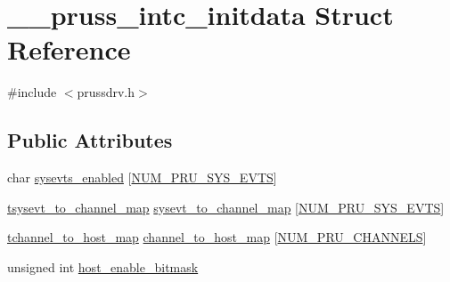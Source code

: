\hypertarget{struct____pruss__intc__initdata}{\section{\-\_\-\-\_\-pruss\-\_\-intc\-\_\-initdata Struct Reference}
\label{struct____pruss__intc__initdata}
}


{\ttfamily \#include $<$prussdrv.\-h$>$}

\subsection*{Public Attributes}
\begin{DoxyCompactItemize}
\item 
char \hyperlink{struct____pruss__intc__initdata_aa2c01e019376c32180ce166302f69ee6}{sysevts\-\_\-enabled} \mbox{[}\hyperlink{prussdrv_8h_a5e00b7de7e11a59dbc6bf36ecd4c67fb}{N\-U\-M\-\_\-\-P\-R\-U\-\_\-\-S\-Y\-S\-\_\-\-E\-V\-T\-S}\mbox{]}
\item 
\hyperlink{prussdrv_8h_af5611a9f693ff52c6da02352010f013a}{tsysevt\-\_\-to\-\_\-channel\-\_\-map} \hyperlink{struct____pruss__intc__initdata_a6f5f3e8c82094df65ca5d4a0b6ad93d9}{sysevt\-\_\-to\-\_\-channel\-\_\-map} \mbox{[}\hyperlink{prussdrv_8h_a5e00b7de7e11a59dbc6bf36ecd4c67fb}{N\-U\-M\-\_\-\-P\-R\-U\-\_\-\-S\-Y\-S\-\_\-\-E\-V\-T\-S}\mbox{]}
\item 
\hyperlink{prussdrv_8h_ae6ce5bff432f557878843c17ad0ce140}{tchannel\-\_\-to\-\_\-host\-\_\-map} \hyperlink{struct____pruss__intc__initdata_a2d70c1e765537925835df6218575accc}{channel\-\_\-to\-\_\-host\-\_\-map} \mbox{[}\hyperlink{prussdrv_8h_acae0799208c38d548a07e381da701129}{N\-U\-M\-\_\-\-P\-R\-U\-\_\-\-C\-H\-A\-N\-N\-E\-L\-S}\mbox{]}
\item 
unsigned int \hyperlink{struct____pruss__intc__initdata_a65a942ffc8d6850954442f7e5252374d}{host\-\_\-enable\-\_\-bitmask}
\end{DoxyCompactItemize}


